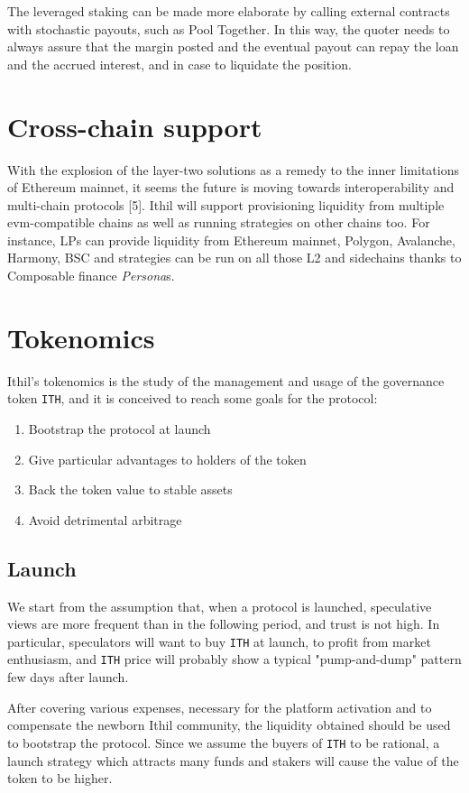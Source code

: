 \documentclass[a4paper,10 pt]{article}
\theoremstyle{definition}
\begin{document}
The leveraged staking can be made more elaborate by calling external contracts with stochastic payouts, such as Pool Together. In this way, the quoter needs to always assure that the margin posted and the eventual payout can repay the loan and the accrued interest, and in case to liquidate the position.

\section{Cross-chain support}
With the explosion of the layer-two solutions as a remedy to the inner limitations of Ethereum mainnet, it seems the future is moving towards interoperability and multi-chain protocols [5].
Ithil will support provisioning liquidity from multiple evm-compatible chains as well as running strategies on other chains too.
For instance, LPs can provide liquidity from Ethereum mainnet, Polygon, Avalanche, Harmony, BSC and strategies can be run on all those L2 and sidechains thanks to Composable finance \textit{Persona}s.


\section{Tokenomics}
Ithil's tokenomics is the study of the management and usage of the governance token \verb|ITH|, and it is conceived to reach some goals for the protocol:
\begin{enumerate}
\item Bootstrap the protocol at launch
\item Give particular advantages to holders of the token
\item Back the token value to stable assets
\item Avoid detrimental arbitrage
\end{enumerate}

\subsection{Launch}\label{launch}

We start from the assumption that, when a protocol is launched, speculative views are more frequent than in the following period, and trust is not high. In particular, speculators will want to buy \verb|ITH| at launch, to profit from market enthusiasm, and \verb|ITH| price will probably show a typical "pump-and-dump" pattern few days after launch.

After covering various expenses, necessary for the platform activation and to compensate the newborn Ithil community, the liquidity obtained should be used to bootstrap the protocol. Since we assume the buyers of \verb|ITH| to be rational, a launch strategy which attracts many funds and stakers will cause the value of the token to be higher.
\end{document}
